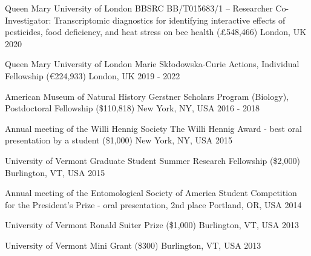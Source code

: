 {\color{awesome}\faAward}


\begin{cventries}

    \cventry
      {Queen Mary University of London} %
      {BBSRC BB/T015683/1 – Researcher Co-Investigator: Transcriptomic diagnostics 
      for identifying interactive effects of pesticides, food deficiency, and heat
      stress on bee health (£548,466)} %
      {London, UK} %
      {2020} %
      {}

    \cventry
      {Queen Mary University of London} %
      {Marie Skłodowska-Curie Actions, Individual Fellowship (€224,933)} %
      {London, UK} %
      {2019 - 2022} %
      {}

    \cventry
      {American Museum of Natural History} %
      {Gerstner Scholars Program (Biology), Postdoctoral Fellowship (\$110,818)} %
      {New York, NY, USA} %
      {2016 - 2018} %
      {}

    \cventry
      {Annual meeting of the Willi Hennig Society} %
      {The Willi Hennig Award - best oral presentation by a student (\$1,000)} %
      {New York, NY, USA} %
      {2015} %
      {}

    \cventry
      {University of Vermont} %
      {Graduate Student Summer Research Fellowship (\$2,000)} %
      {Burlington, VT, USA} %
      {2015} %
      {}

    \cventry
      {Annual meeting of the Entomological Society of America} %
      {Student Competition for the President's Prize - oral presentation, 2nd place} %
      {Portland, OR, USA} %
      {2014} %
      {}

    \cventry
      {University of Vermont} %
      {Ronald Suiter Prize (\$1,000)} %
      {Burlington, VT, USA} %
      {2013} %
      {}
  
    \cventry
      {University of Vermont} %
      {Mini Grant (\$300)} %
      {Burlington, VT, USA} %
      {2013} %
      {}

\end{cventries}
